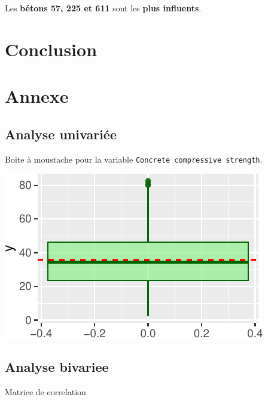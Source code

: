 \documentclass[
  12pt,
]{article}
\begin{document}
Les \textbf{bétons 57, 225 et 611} sont les \textbf{plus influents}.

\section{Conclusion}\label{conclusion}

\section{Annexe}\label{annexe}

\subsection{Analyse univariée}\label{analyse-univariuxe9e}

Boite à moustache pour la variable
\texttt{Concrete\ compressive\ strength}.

\begin{center}\includegraphics{rmd_final_files/figure-latex/unnamed-chunk-30-1} \end{center}

\subsection{Analyse bivariee}\label{analyse-bivariee}

Matrice de correlation
\end{document}
